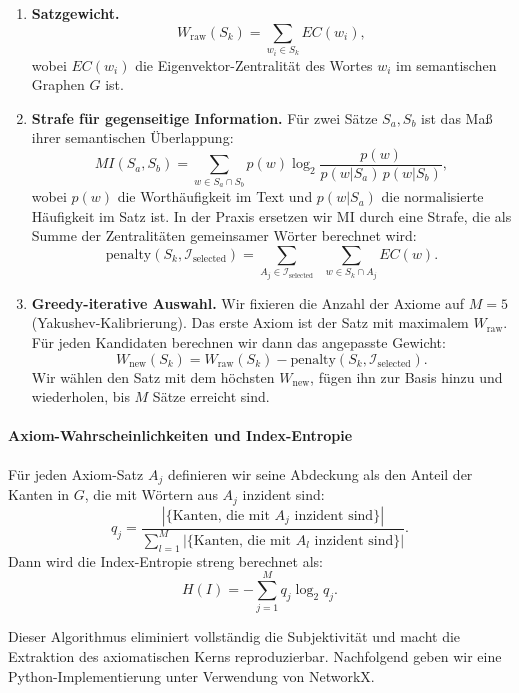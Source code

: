 \documentclass[12pt,a4paper]{article}
\begin{document}
	\begin{enumerate}
		\item \textbf{Satzgewicht.}
		\[
		W_{\text{raw}}(S_k) = \sum_{w_i \in S_k} EC(w_i),
		\]
		wobei \(EC(w_i)\) die Eigenvektor-Zentralität des Wortes \(w_i\) im semantischen Graphen \(G\) ist.
		
		\item \textbf{Strafe für gegenseitige Information.}
		Für zwei Sätze \(S_a, S_b\) ist das Maß ihrer semantischen Überlappung:
		\[
		MI(S_a, S_b) = \sum_{w \in S_a \cap S_b} p(w) \log_2 \frac{p(w)}{p(w|S_a)\, p(w|S_b)},
		\]
		wobei \(p(w)\) die Worthäufigkeit im Text und \(p(w|S_a)\) die normalisierte Häufigkeit im Satz ist. In der Praxis ersetzen wir MI durch eine Strafe, die als Summe der Zentralitäten gemeinsamer Wörter berechnet wird:
		\[
		\text{penalty}(S_k, \mathcal{I}_{\text{selected}}) = \sum_{A_j \in \mathcal{I}_{\text{selected}}} \;\; \sum_{w \in S_k \cap A_j} EC(w).
		\]
		
		\item \textbf{Greedy-iterative Auswahl.}
		Wir fixieren die Anzahl der Axiome auf \(M = 5\) (Yakushev-Kalibrierung). Das erste Axiom ist der Satz mit maximalem \(W_{\text{raw}}\). Für jeden Kandidaten berechnen wir dann das angepasste Gewicht:
		\[
		W_{\text{new}}(S_k) = W_{\text{raw}}(S_k) - \text{penalty}(S_k, \mathcal{I}_{\text{selected}}).
		\]
		Wir wählen den Satz mit dem höchsten \(W_{\text{new}}\), fügen ihn zur Basis hinzu und wiederholen, bis \(M\) Sätze erreicht sind.
	\end{enumerate}
	
	\paragraph{Axiom-Wahrscheinlichkeiten und Index-Entropie}
	Für jeden Axiom-Satz \(A_j\) definieren wir seine Abdeckung als den Anteil der Kanten in \(G\), die mit Wörtern aus \(A_j\) inzident sind:
	\[
	q_j = \frac{|\{\text{Kanten, die mit } A_j \text{ inzident sind}\}|}{\sum_{l=1}^M |\{\text{Kanten, die mit } A_l \text{ inzident sind}\}|}.
	\]
	Dann wird die Index-Entropie streng berechnet als:
	\[
	H(I) = -\sum_{j=1}^{M} q_j \log_2 q_j.
	\]
	
	Dieser Algorithmus eliminiert vollständig die Subjektivität und macht die Extraktion des axiomatischen Kerns reproduzierbar. Nachfolgend geben wir eine Python-Implementierung unter Verwendung von NetworkX.
	
\end{document}
